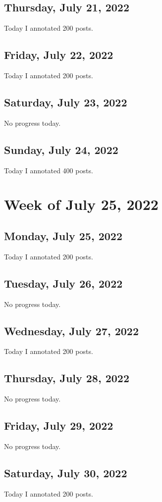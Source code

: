 \documentclass[11pt,letterpaper]{article}
\begin{document}
\subsection{Thursday, July 21, 2022}
Today I annotated 200 posts.

\subsection{Friday, July 22, 2022}
Today I annotated 200 posts.

\subsection{Saturday, July 23, 2022}
No progress today.


\subsection{Sunday, July 24, 2022}
Today I annotated 400 posts.

\section{Week of July 25, 2022}
\subsection{Monday, July 25, 2022}
Today I annotated 200 posts.

\subsection{Tuesday, July 26, 2022}
No progress today.

\subsection{Wednesday, July 27, 2022}
Today I annotated 200 posts.

\subsection{Thursday, July 28, 2022}
No progress today.

\subsection{Friday, July 29, 2022}
No progress today.

\subsection{Saturday, July 30, 2022}
Today I annotated 200 posts.
\end{document}
